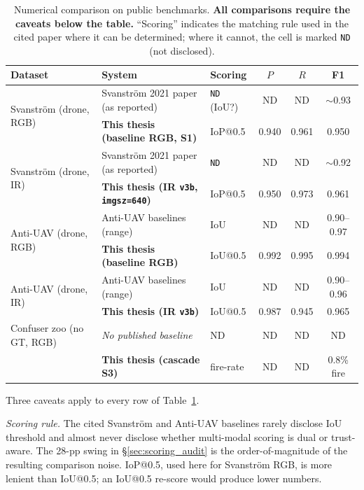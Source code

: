 \begin{table}[htbp]
    \centering
    \caption{Numerical comparison on public benchmarks. \textbf{All comparisons require the caveats below the table.} ``Scoring'' indicates the matching rule used in the cited paper where it can be determined; where it cannot, the cell is marked \texttt{ND} (not disclosed).}
    \label{tab:numerical_comparison}
    \begin{tabular}{lllccc}
        \toprule
        Dataset & System & Scoring & $P$ & $R$ & F1 \\
        \midrule
        \multirow{2}{*}{Svanstr\"om (drone, RGB)} & Svanstr\"om 2021 paper (as reported) & \texttt{ND} (IoU?) & ND & ND & $\sim$0.93 \\
                                                   & \textbf{This thesis (baseline RGB, S1)} & IoP@0.5 & 0.940 & 0.961 & 0.950 \\
        \midrule
        \multirow{2}{*}{Svanstr\"om (drone, IR)}  & Svanstr\"om 2021 paper (as reported) & \texttt{ND} & ND & ND & $\sim$0.92 \\
                                                   & \textbf{This thesis (IR \texttt{v3b}, \texttt{imgsz=640})} & IoP@0.5 & 0.950 & 0.973 & 0.961 \\
        \midrule
        \multirow{2}{*}{Anti-UAV (drone, RGB)}    & Anti-UAV baselines (range) & IoU & ND & ND & 0.90--0.97 \\
                                                   & \textbf{This thesis (baseline RGB)} & IoU@0.5 & 0.992 & 0.995 & 0.994 \\
        \midrule
        \multirow{2}{*}{Anti-UAV (drone, IR)}     & Anti-UAV baselines (range) & IoU & ND & ND & 0.90--0.96 \\
                                                   & \textbf{This thesis (IR \texttt{v3b})} & IoU@0.5 & 0.987 & 0.945 & 0.965 \\
        \midrule
        Confuser zoo (no GT, RGB)                  & \emph{No published baseline} & ND & ND & ND & ND \\
                                                   & \textbf{This thesis (cascade S3)} & fire-rate & ND & ND & 0.8\% fire \\
        \bottomrule
    \end{tabular}
\end{table}

Three caveats apply to every row of Table~\ref{tab:numerical_comparison}.

\emph{Scoring rule.} The cited Svanstr\"om and Anti-UAV baselines rarely disclose IoU threshold and almost never disclose whether multi-modal scoring is dual or trust-aware. The 28-pp swing in \S\ref{sec:scoring_audit} is the order-of-magnitude of the resulting comparison noise. IoP@0.5, used here for Svanstr\"om RGB, is more lenient than IoU@0.5; an IoU@0.5 re-score would produce lower numbers.

